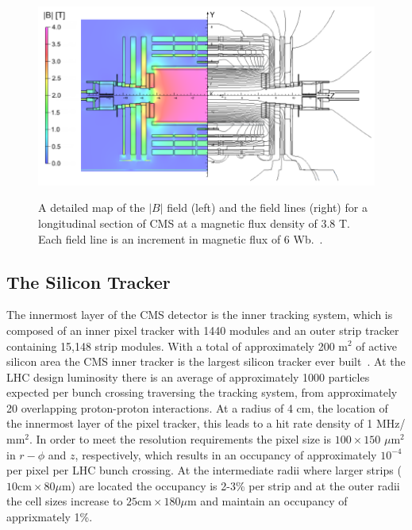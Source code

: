 \begin{figure}[!Hh]
       \centering
       \includegraphics[scale=0.4]{Figures/CMSfieldlines.png} \\
       \caption[The values of the magnetic field and field lines of the CMS magnet in operation.]{A detailed map of the $|B|$ field (left) and the field lines (right) for a longitudinal section of CMS at a magnetic flux density of 3.8 T.  Each field line is an increment in magnetic flux of 6 Wb.~\cite{CMSperformance}.}
\label{figapp:CMSfieldlines}
\end{figure}

\subsection{The Silicon Tracker}
\label{tracker}

The innermost layer of the CMS detector is the inner tracking system, which is composed of an inner pixel tracker with 1440 modules and an outer strip tracker containing 15,148 strip modules.  With a total of approximately 200 $\text{m}^2$ of active silicon area the CMS inner tracker is the largest silicon tracker ever built~\cite{CMSdetector}.  At the LHC design luminosity there is an average of approximately 1000 particles expected per bunch crossing traversing the tracking system, from approximately 20 overlapping proton-proton interactions.  At a radius of 4 cm, the location of the innermost layer of the pixel tracker, this leads to a hit rate density of 1 MHz/$\text{mm}^2$.  In order to meet the resolution requirements the pixel size is $100 \times 150$ $\mu\text{m}^2$ in $r-\phi$ and $z$, respectively, which results in an occupancy of approximately $10^{-4}$ per pixel per LHC bunch crossing.  At the intermediate radii where larger strips ($10 \text{cm} \times 80 \mu\text{m}$) are located the occupancy is 2-3\% per strip and at the outer radii the cell sizes increase to $25 \text{cm} \times 180 \mu\text{m}$ and maintain an occupancy of apprixmately 1\%.  


